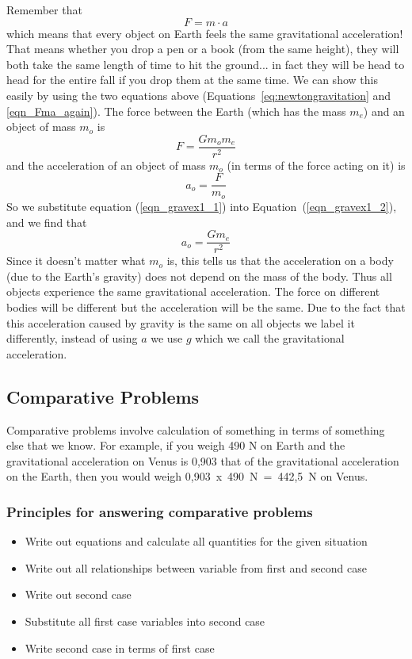 Remember that
\begin{equation}
\label{eqn_Fma_again}
F=m\cdot a
\end{equation}
which means that every object on Earth feels the same gravitational acceleration! That means whether you drop a pen or a book (from the same height), they will both take the same length of time to hit the ground... in fact they will be head to head for the entire fall if you drop them at the
same time. We can show this easily by using the two equations above (Equations~\ref{eq:newtongravitation} and \ref{eqn_Fma_again}). The force between the Earth (which has the mass $m_e$) and an object of mass $m_o$ is
\begin{equation}
\label{eqn_gravex1_1}
F=\frac{G m_o m_e}{r^2}
\end{equation}
and the acceleration of an object of mass $m_o$ (in terms of the force acting on it) is
\begin{equation}
\label{eqn_gravex1_2}
a_o=\frac{F}{m_o}
\end{equation}
So we substitute equation (\ref{eqn_gravex1_1}) into Equation~(\ref{eqn_gravex1_2}), and we find that
\begin{equation}
\label{eqn_gravex1_3}
a_o=\frac{G m_e}{r^2}
\end{equation}
Since it doesn't matter what $m_o$ is, this tells us that the acceleration on a body (due to the Earth's gravity) does not depend on the mass of the body. Thus all objects experience the same gravitational acceleration. The force on different bodies will be different but the acceleration will be the same. Due to the fact that this acceleration caused by gravity is the same on all objects we label it differently, instead of using $a$ we use $g$ which we call the gravitational acceleration.

\subsection{Comparative Problems}
Comparative problems involve calculation of something in terms of something else that we know. For example, if you weigh 490 N on Earth and the gravitational acceleration on Venus is 0,903 that of the gravitational acceleration on the Earth, then you would weigh 0,903~x~490~N~=~442,5~N on Venus.

\subsubsection{Principles for answering comparative problems}
\begin{itemize}
\item Write out equations and calculate all quantities for the given situation
\item Write out all relationships between variable from first and
second case
\item Write out second case
\item Substitute all first case variables into second case
\item Write second case in terms of first case
\end{itemize}


